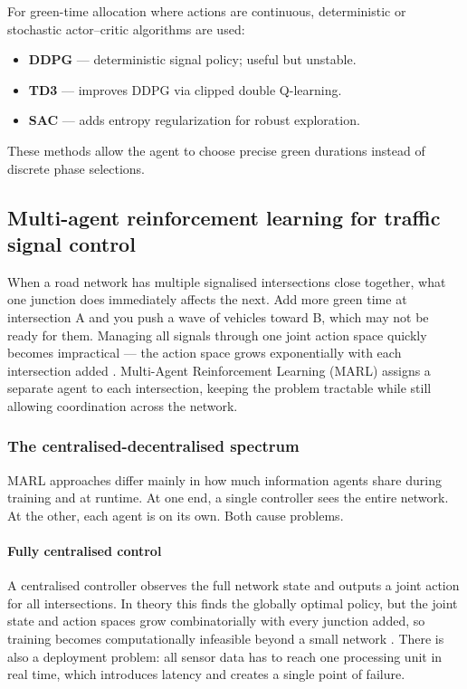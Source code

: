 \documentclass[11pt, a4paper]{report}
\begin{document}
For green-time allocation where actions are continuous, deterministic or stochastic actor--critic algorithms are used:

\begin{itemize}
    \item \textbf{DDPG} --- deterministic signal policy; useful but unstable.
    \item \textbf{TD3} --- improves DDPG via clipped double Q-learning.
    \item \textbf{SAC} --- adds entropy regularization for robust exploration.
\end{itemize}

These methods allow the agent to choose precise green durations instead of discrete phase selections.

\subsection{Multi-agent reinforcement learning for traffic signal control}

When a road network has multiple signalised intersections close together, what one junction does immediately affects the next. Add more green time at intersection A and you push a wave of vehicles toward B, which may not be ready for them. Managing all signals through one joint action space quickly becomes impractical — the action space grows exponentially with each intersection added \cite{busoniu2008comprehensive}. Multi-Agent Reinforcement Learning (MARL) assigns a separate agent to each intersection, keeping the problem tractable while still allowing coordination across the network.

\subsubsection{The centralised-decentralised spectrum}

MARL approaches differ mainly in how much information agents share during training and at runtime. At one end, a single controller sees the entire network. At the other, each agent is on its own. Both cause problems.

\paragraph{Fully centralised control}

A centralised controller observes the full network state and outputs a joint action for all intersections. In theory this finds the globally optimal policy, but the joint state and action spaces grow combinatorially with every junction added, so training becomes computationally infeasible beyond a small network \cite{mannion2016experimental}. There is also a deployment problem: all sensor data has to reach one processing unit in real time, which introduces latency and creates a single point of failure.
\end{document}
